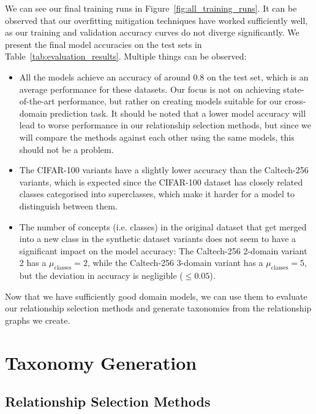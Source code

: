 We can see our final training runs in Figure~\ref{fig:all_training_runs}.
It can be observed that our overfitting mitigation techniques have worked sufficiently well,
as our training and validation accuracy curves do not diverge significantly.
We present the final model accuracies on the test sets in Table~\ref{tab:evaluation_results}.
Multiple things can be observed:
\begin{itemize}
      \item All the models achieve an accuracy of around 0.8 on the test set,
            which is an average performance for these datasets.
            Our focus is not on achieving state-of-the-art performance,
            but rather on creating models suitable for our cross-domain prediction task.
            It should be noted that a lower model accuracy will lead to worse performance
            in our relationship selection methods, but since we will compare the methods against each other
            using the same models, this should not be a problem.
      \item The CIFAR-100 variants have a slightly lower accuracy than the Caltech-256 variants,
            which is expected since the CIFAR-100 dataset has closely related classes
            categorised into superclasses, which make it harder for a model to distinguish between them.
      \item The number of concepts (i.e. classes) in the original dataset that get merged
            into a new class in the synthetic dataset variants does not seem to have a significant impact
            on the model accuracy: The Caltech-256 2-domain variant 2 has a $\mu_{\text{classes}}=2$,
            while the Caltech-256 3-domain variant has a $\mu_{\text{classes}}=5$,
            but the deviation in accuracy is negligible ($\leq 0.05$).
\end{itemize}

Now that we have sufficiently good domain models,
we can use them to evaluate our relationship selection methods
and generate taxonomies from the relationship graphs we create.

\section{Taxonomy Generation}

\subsection{Relationship Selection Methods} \label{sec:relationship_selection}

